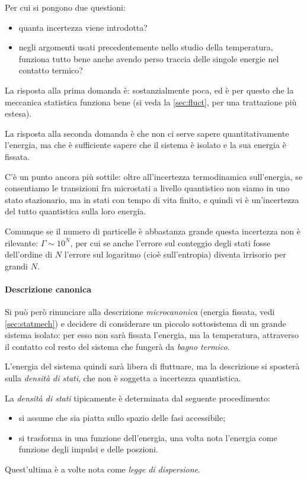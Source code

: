 Per cui si pongono due questioni:
\begin{itemize}
	\item quanta incertezza viene introdotta?
	\item negli argomenti usati precedentemente nello studio della temperatura, funziona tutto bene anche avendo perso traccia delle singole energie nel contatto termico?
\end{itemize}

La risposta alla prima domanda è: sostanzialmente poca, ed è per questo che la meccanica statistica funziona bene (si veda la \cref{sec:fluct}, per una trattazione più estesa).

La risposta alla seconda domanda è che non ci serve sapere quantitativamente l'energia, ma che è sufficiente sapere che il sistema è isolato e la sua energia è fissata.
\newline

C'è un punto ancora più sottile: oltre all'incertezza termodinamica sull'energia, se consentiamo le transizioni fra microstati a livello quantistico non siamo in uno stato stazionario, ma in stati con tempo di vita finito, e quindi vi è un'incertezza del tutto quantistica sulla loro energia.

Comunque se il numero di particelle è abbastanza grande questa incertezza non è rilevante: $\Gamma \sim 10^N$, per cui se anche l'errore sul conteggio degli stati fosse dell'ordine di $ N $ l'errore sul logaritmo (cioè sull'entropia) diventa irrisorio per grandi $ N $.

\paragraph{Descrizione canonica} Si può però rinunciare alla descrizione \textit{microcanonica} (energia fissata, vedi \cref{sec:statmech}) e decidere di considerare un piccolo sottosistema di un grande sistema isolato: per esso non sarà fissata l'energia, ma la temperatura, attraverso il contatto col resto del sistema che fungerà da \textit{bagno termico}.

L'energia del sistema quindi sarà libera di fluttuare, ma la descrizione si sposterà sulla \textit{densità di stati}, che non è soggetta a incertezza quantistica.

\begin{note}
	La \textit{densità di stati} tipicamente è determinata dal seguente procedimento:
	\begin{itemize}
		\item si assume che sia piatta sullo spazio delle fasi accessibile;
		\item si trasforma in una funzione dell'energia, una volta nota l'energia come funzione degli impulsi e delle poszioni.
	\end{itemize}
	Quest'ultima è a volte nota come \textit{legge di dispersione}.
\end{note}

